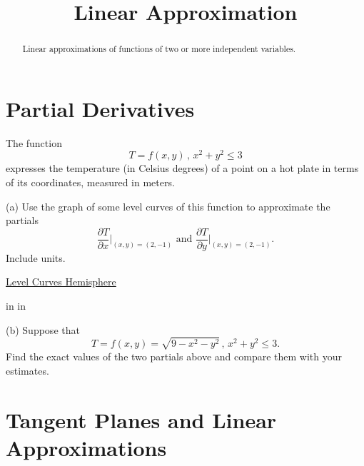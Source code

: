\documentclass{ximera}
\title{Linear Approximation}
\newcommand{\pskip}{\vskip 0.1 in}
\begin{document}
\begin{abstract}
Linear approximations of functions of two or more independent variables.
\end{abstract}
\maketitle


\section{Partial Derivatives}

\begin{example}  \label{Edgtr543}

The function
\[
    T = f(x,y) \, , \, x^2 + y^2 \leq 3
\]
expresses the temperature (in Celsius degrees) of a point on a hot plate in terms of its coordinates, measured in meters. 

(a) Use the graph of some level curves of this function to approximate the partials
\[
    \frac{\partial T}{\partial x}\Big|_{(x,y)=(2,-1)} \text{ and } \frac{\partial T}{\partial y}\Big|_{(x,y)=(2,-1)} .
\]
Include units.

 
\begin{onlineOnly}
    \begin{center}
\end{center}
\end{onlineOnly}

\href{https://www.desmos.com/calculator/bphah69tkz}{Level Curves Hemisphere}

\pskip \pskip

(b) Suppose that 
\[
    T = f(x,y) = \sqrt{9-x^2-y^2} \, , \, x^2 + y^2 \leq 3 .
\]
Find the exact values of the two partials above and compare them with your estimates.

\end{example}

\section{Tangent Planes and Linear Approximations}
\end{document}
